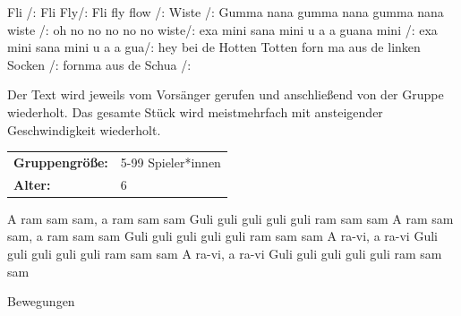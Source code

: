     Fli /: \newline
Fli Fly/: \newline
Fli fly flow /:\newline
Wiste /:\newline
Gumma nana gumma nana gumma nana wiste /:\newline
oh no no no no no wiste/:\newline
exa mini sana mini u a a guana mini /:\newline
exa mini sana mini u a a gua/:\newline
hey bei de Hotten Totten forn ma aus de linken Socken /:\newline
fornma aus de Schua /:\newline

Der Text wird jeweils vom Vorsänger gerufen und anschließend von der Gruppe wiederholt. Das gesamte Stück wird meistmehrfach mit ansteigender Geschwindigkeit wiederholt.
    \\



\begin{table}[H]
\begin{tabular}{>{\bfseries}lp{8cm}}
   Gruppengröße:   & 5-99 Spieler*innen\\
    Alter: & 6 \\
\end{tabular}
\end{table} 


    A ram sam sam, \newline
 a ram sam sam \newline
Guli guli guli guli guli ram sam sam\newline
A ram sam sam,\newline
 a ram sam sam\newline
Guli guli guli guli guli ram sam sam\newline
A ra-vi, a ra-vi\newline
Guli guli guli guli guli ram sam sam\newline
A ra-vi, a ra-vi\newline
Guli guli guli guli guli ram sam sam\newline\newline

Bewegungen\newline

